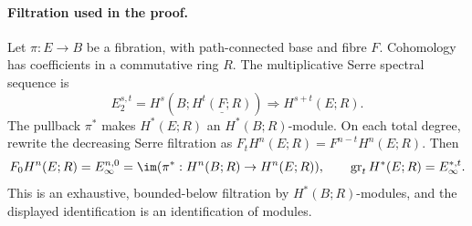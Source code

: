 
\paragraph{Filtration used in the proof.}
Let $\pi:E\to B$ be a fibration, with path-connected base and fibre $F$.
Cohomology has coefficients in a commutative ring $R$. The multiplicative Serre
spectral sequence is
\[
 E_2^{s,t}=H^s(B;\underline{H^t(F;R)})\Longrightarrow H^{s+t}(E;R).
\]
The pullback $\pi^*$ makes $H^*(E;R)$ an $H^*(B;R)$-module. On each total
degree, rewrite the decreasing Serre filtration as
$F_tH^n(E;R)=F^{n-t}H^n(E;R)$. Then
\[
 F_0H^n(E;R)=E_\infty^{n,0}=\im(\pi^*:H^n(B;R)\to H^n(E;R)),
 \qquad \operatorname{gr}_tH^*(E;R)=E_\infty^{*,t}.
\]
This is an exhaustive, bounded-below filtration by $H^*(B;R)$-modules, and
the displayed identification is an identification of modules.

